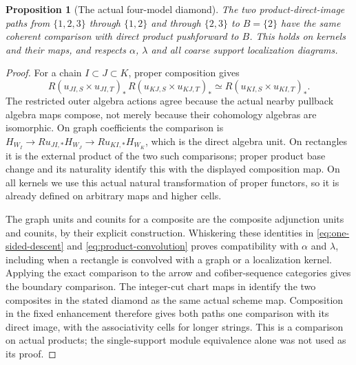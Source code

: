\documentclass[11pt]{article}
\newtheorem{proposition}{Proposition}[section]
\theoremstyle{definition}
\theoremstyle{remark}
\begin{document}
\begin{proposition}[The actual four-model diamond]
\label{prop:product-diamond}
The two product-direct-image paths from $\{1,2,3\}$ through
$\{1,2\}$ and through $\{2,3\}$ to $B=\{2\}$ have the same
coherent comparison with direct product pushforward to $B$.
This holds on kernels and their maps, and respects $\alpha$, $\lambda$
and all coarse support localization diagrams.
\end{proposition}
\begin{proof}
For a chain $I\subset J\subset K$, proper composition gives
\[
 R(u_{JI,S}\times u_{JI,T})_*\,
 R(u_{KJ,S}\times u_{KJ,T})_*
       \simeq R(u_{KI,S}\times u_{KI,T})_*.
\]
The restricted outer algebra actions agree because the actual nearby
pullback algebra maps compose, not merely because their cohomology
algebras are isomorphic.  On graph coefficients the comparison is
$H_{W_I}\to Ru_{JI,*}H_{W_J}\to Ru_{KI,*}H_{W_K}$,
which is the direct algebra unit.  On rectangles it is the external
product of the two such comparisons; proper product base change
and its naturality identify this with the displayed composition map.
On all kernels we use this actual natural transformation of proper
functors, so it is already defined on arbitrary maps and higher cells.

The graph units and counits for a composite are the composite
adjunction units and counits, by their explicit construction.
Whiskering these identities in \eqref{eq:one-sided-descent} and
\eqref{eq:product-convolution} proves compatibility with $\alpha$
and $\lambda$, including when a rectangle is convolved with a graph
or a localization kernel.  Applying the exact comparison to the
arrow and cofiber-sequence categories gives the boundary comparison.
The integer-cut chart maps in \cite{Refinement} identify the two
composites in the stated diamond as the same actual scheme map.
Composition in the fixed enhancement therefore gives both paths
one comparison with its direct image, with the associativity cells
for longer strings.  This is a comparison on actual products; the
single-support module equivalence alone was not used as its proof.
\end{proof}
\end{document}

